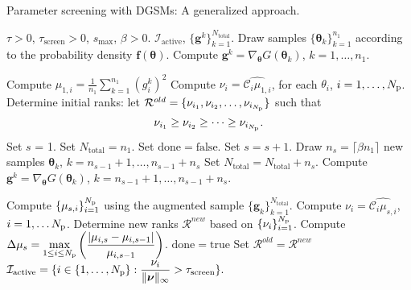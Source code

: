 \begin{breakablealgorithm}
\renewcommand{\algorithmicrequire}{\textbf{Input:}}
\renewcommand{\algorithmicensure}{\textbf{Output:}}
  \caption{Parameter screening with DGSMs: A generalized approach.}
  \begin{algorithmic}[1]
\Require $\tau > 0$, $\tau_\text{screen} > 0$,
$s_\text{max}$, $\beta > 0$. 
\Ensure $\mathcal{I}_\text{active}$, $\{ \bm{g}^k \}_{k=1}^{N_\text{total}}$. 
      \State Draw samples $\{ \bm{\theta}_k \}_{k = 1}^{n_1}$ 
       according to the probability density $\bm{f(\theta)}$.
      \State Compute $\bm{g}^k = \nabla_{\bm{\theta}}G(\bm\theta_k)$, 
             $k = 1, \ldots, n_1$. 

      \State Compute 
      $\mu_{1, i} = \frac{1}{n_1} \sum_{k = 1}^{n_1} (g^k_i)^2$
      \State Compute $\nu_i = \widehat{\mathcal{C}_i\mu_{1,i}}$, for each $\theta_i$, 
             $i = 1, \ldots, {N_\text{p}}$. 
      \State Determine initial ranks: 
            let $\mathcal{R}^{old} = \{ \nu_{i_1}, \nu_{i_2}, \ldots, \nu_{i_{N_\text{p}}}\}$ such that 
\[
   \nu_{i_1} \geq \nu_{i_2} \geq \cdots \geq \nu_{i_{N_\text{p}}}. 
\]
      \State Set $s$ = 1.
      \State Set $N_\text{total} = n_1$.
      \State Set $\mathrm{done} = \mathrm{false}$.
        \State Set $s = s + 1$.
        \State Draw $n_s = \lceil \beta n_1 \rceil$ new samples 
                  $\bm{\theta}_k$, $k = n_{s-1} + 1, \ldots, n_{s-1} + n_s$
       \State Set $N_\text{total} = N_\text{total} + n_s$.
        \State Compute $\bm{g}^k = \nabla_{\bm{\theta}}G(\bm\theta_k)$,
             $k = n_{s-1}+1, \ldots, n_{s-1}+n_s$.

        \State Compute $\{ \mu_{s,i} \}_{i=1}^{N_\text{p}}$ using the augmented sample 
               $\{\bm{g}_k \}_{k = 1}^{N_\text{total}}$.
        \State Compute $\nu_i = \widehat{\mathcal{C}_i\mu_{s,i}}$, $i = 1, \ldots {N_\text{p}}$.
        \State Determine new ranks $\mathcal{R}^{new}$ based on $\{\nu_i\}_{i=1}^{N_\text{p}}$. 
        \State Compute $\displaystyle\Delta\mu_s = \max_{1\leq i \leq {N_\text{p}}}
               \left(\frac{|\mu_{i,s} - \mu_{i,s-1}|}{ \mu_{i,s-1}}\right)$.
         \State $\mathrm{done} = \mathrm{true}$
      \Else
          \State Set $\mathcal{R}^{old} = \mathcal{R}^{new}$
      \EndIf
    \EndWhile
    \State $\mathcal{I}_\text{active} = \{ i \in \{1, \ldots, {N_\text{p}}\} : \displaystyle\frac{\nu_i}
        {\|\bm{\nu}\|_\infty} > \tau_\text{screen}\}.$
    
    \EndProcedure
  \end{algorithmic}
  \label{alg:screen}
\end{breakablealgorithm}

